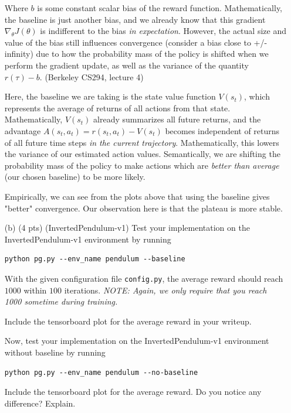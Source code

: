 \documentclass{article}
\begin{document}
\begin{enumerate}
Where $b$ is some constant scalar bias of the reward function. Mathematically, the baseline is just another bias, and we already know that this gradient $\nabla_{\theta}J(\theta)$ is indifferent to the bias \textit{in expectation}. However, the actual size and value of the bias still influences convergence (consider a bias close to +/- infinity) due to how the probability mass of the policy is shifted when we perform the gradient update, as well as the variance of the quantity $r(\tau)-b$. (Berkeley CS294, lecture 4)

Here, the baseline we are taking is the state value function $V(s_t)$, which represents the average of returns of all actions from that state. Mathematically, $V(s_t)$ already summarizes all future returns, and the advantage $A(s_t, a_t) = r(s_t, a_t) - V(s_t)$ becomes independent of returns of all future time steps \textit{in the current trajectory}. Mathematically, this lowers the variance of our estimated action values. Semantically, we are shifting the probability mass of the policy to make actions which are \textit{better than average} (our chosen baseline) to be more likely.

Empirically, we can see from the plots above that using the baseline gives "better" convergence. Our observation here is that the plateau is more stable.

\item[(b) (4 pts)](InvertedPendulum-v1)
Test your implementation on the InvertedPendulum-v1 environment by running
\begin{tcolorbox}
\begin{verbatim}
python pg.py --env_name pendulum --baseline
\end{verbatim}
\end{tcolorbox}

With the given configuration file \texttt{config.py}, the average reward should reach $1000$ within $100$ iterations. \emph{NOTE: Again, we only require that you reach 1000 sometime during training.} 

Include the tensorboard plot for the average reward in your writeup.

Now, test your implementation on the InvertedPendulum-v1 environment without baseline by running
\begin{tcolorbox}
\begin{verbatim}
python pg.py --env_name pendulum --no-baseline
\end{verbatim}
\end{tcolorbox}
Include the tensorboard plot for the average reward. Do you notice any difference? Explain.


\end{enumerate}
\end{document}
